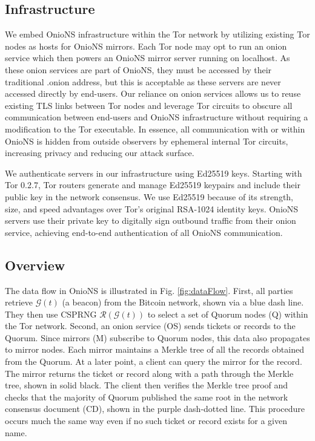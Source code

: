 \documentclass[USenglish,oneside,twocolumn]{article}
\begin{document}
\subsection{Infrastructure}

We embed OnioNS infrastructure within the Tor network by utilizing existing Tor nodes as hosts for OnioNS mirrors. Each Tor node may opt to run an onion service which then powers an OnioNS mirror server running on localhost. As these onion services are part of OnioNS, they must be accessed by their traditional .onion address, but this is acceptable as these servers are never accessed directly by end-users. Our reliance on onion services allows us to reuse existing TLS links between Tor nodes and leverage Tor circuits to obscure all communication between end-users and OnioNS infrastructure without requiring a modification to the Tor executable. In essence, all communication with or within OnioNS is hidden from outside observers by ephemeral internal Tor circuits, increasing privacy and reducing our attack surface. %

We authenticate servers in our infrastructure using Ed25519 \cite{bernstein2012high} keys. Starting with Tor 0.2.7, Tor routers generate and manage Ed25519 keypairs and include their public key in the network consensus. We use Ed25519 because of its strength, size, and speed advantages over Tor's original RSA-1024 identity keys. OnioNS servers use their private key to digitally sign outbound traffic from their onion service, achieving end-to-end authentication of all OnioNS communication.

\subsection{Overview}
\label{sec:overview}

The data flow in OnioNS is illustrated in Fig. \ref{fig:dataFlow}. First, all parties retrieve $ \mathcal{G}(t) $ (a beacon) from the Bitcoin network, shown via a blue dash line. They then use CSPRNG $ \mathcal{R}(\mathcal{G}(t)) $ to select a set of Quorum nodes (Q) within the Tor network. Second, an onion service (OS) sends tickets or records to the Quorum. Since mirrors (M) subscribe to Quorum nodes, this data also propagates to mirror nodes. Each mirror maintains a Merkle tree of all the records obtained from the Quorum. At a later point, a client can query the mirror for the record. The mirror returns the ticket or record along with a path through the Merkle tree, shown in solid black. The client then verifies the Merkle tree proof and checks that the majority of Quorum published the same root in the network consensus document (CD), shown in the purple dash-dotted line. This procedure occurs much the same way even if no such ticket or record exists for a given name. %
\end{document}
